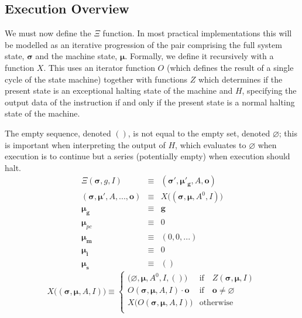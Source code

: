 \documentclass[9pt,oneside]{amsart}
\begin{document}
\begin{multicols}{2}
\subsection{Execution Overview}

We must now define the $\Xi$ function. In most practical implementations this will be modelled as an iterative progression of the pair comprising the full system state, $\boldsymbol{\sigma}$ and the machine state, $\boldsymbol{\mu}$. Formally, we define it recursively with a function $X$. This uses an iterator function $O$ (which defines the result of a single cycle of the state machine) together with functions $Z$ which determines if the present state is an exceptional halting state of the machine and $H$, specifying the output data of the instruction if and only if the present state is a normal halting state of the machine.

\hypertarget{emptySequence}{}
The empty sequence, denoted {{$()$}}, is not equal to the empty set, denoted $\varnothing$; this is important when interpreting the output of $H$, which evaluates to $\varnothing$ when execution is to continue but a series (potentially empty) when execution should halt.
\begin{eqnarray}
\Xi(\boldsymbol{\sigma}, g, I) & \equiv & (\boldsymbol{\sigma}'\!, \boldsymbol{\mu}'_\mathbf{g}, A, \mathbf{o}) \\
(\boldsymbol{\sigma}, \boldsymbol{\mu}'\!, A, ..., \mathbf{o}) & \equiv & X\big((\boldsymbol{\sigma}, \boldsymbol{\mu}, A^0\!, I)\big) \\
\boldsymbol{\mu}_\mathbf{g} & \equiv & \mathbf{g} \\
\boldsymbol{\mu}_{pc} & \equiv & 0 \\
\boldsymbol{\mu}_\mathbf{m} & \equiv & (0, 0, ...) \\
\boldsymbol{\mu}_\mathbf{i} & \equiv & 0 \\
\boldsymbol{\mu}_\mathbf{s} & \equiv & ()
\end{eqnarray}
\begin{equation}
X\big( (\boldsymbol{\sigma}, \boldsymbol{\mu}, A, I) \big) \equiv \begin{cases}
\big(\varnothing, \boldsymbol{\mu}, A^0, I, ()\big) & \text{if} \quad Z(\boldsymbol{\sigma}, \boldsymbol{\mu}, I)\\
O(\boldsymbol{\sigma}, \boldsymbol{\mu}, A, I) \cdot \mathbf{o} & \text{if} \quad \mathbf{o} \neq \varnothing\\
X\big(O(\boldsymbol{\sigma}, \boldsymbol{\mu}, A, I)\big) & \text{otherwise}\\
\end{cases}
\end{equation}


\end{multicols}
\end{document}
